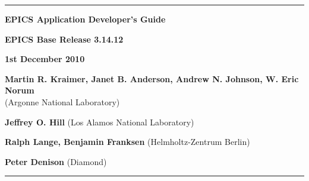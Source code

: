 \hrule

\vspace{1in}

\noindent \Huge \textbf{EPICS Application Developer's Guide}

\vspace{0.5in}

\noindent \Large \textbf{EPICS Base Release 3.14.12}

\noindent \textbf{1st December 2010}

\vspace{0.5in}

\noindent \normalsize \textbf{Martin R. Kraimer, Janet B. Anderson, Andrew N. Johnson, W. Eric Norum}\\
(Argonne National Laboratory)

\noindent \textbf{Jeffrey O. Hill} (Los Alamos National Laboratory)

\noindent \textbf{Ralph Lange, Benjamin Franksen} (Helmholtz-Zentrum Berlin)

\noindent \textbf{Peter Denison} (Diamond)

\vspace{1in}
\hrule
